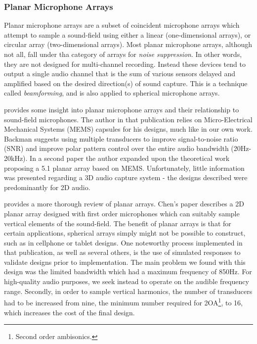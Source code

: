 \subsubsection{Planar Microphone Arrays}

Planar microphone arrays are a subset of coincident microphone arrays which attempt to sample a sound-field using either a linear (one-dimensional arrays), or circular array (two-dimensional arrays). Most planar microphone arrays, although not all, fall under tha category of arrays for \textit{noise suppression}. In other words, they are not designed for multi-channel recording. Instead these devices tend to output a single audio channel that is the sum of various sensors delayed and amplified based on the desired direction(s) of sound capture. This is a technique called \textit{beamforming}, and is also applied to spherical microphone arrays.

\cite{backman2006miniature} provides some insight into planar microphone arrays and their relationship to sound-field microphones. The author in that publication relies on Micro-Electrical Mechanical Systems (MEMS) capsules for his designs, much like in our own work. Backman suggests using multiple transducers to improve signal-to-noise ratio (SNR) and improve polar pattern control over the entire audio bandwidth (20Hz-20kHz). In a second paper \cite{backman2006gradient} the author expanded upon the theoretical work proposing a 5.1 planar array based on MEMS. Unfortunately, little information was presented regarding a 3D audio capture system - the designs described were predominantly for 2D audio. 


\cite{chen2015theory} provides a more thorough review of planar arrays. Chen's paper describes a 2D planar array designed with first order microphones which can suitably sample vertical elements of the sound-field. The benefit of planar arrays is that for certain applications, spherical arrays simply might not be possible to construct, such as in cellphone or tablet designs. One noteworthy process implemented in that publication, as well as several others, is the use of simulated responses to validate designs prior to implementation. The main problem we found with this design was the limited bandwidth which had a maximum frequency of 850Hz. For high-quality audio purposes, we seek instead to operate on the audible frequency range. Secondly, in order to sample vertical harmonics, the number of transducers had to be increased from nine, the minimum number required for 2OA\footnote{Second order ambisonics.}, to 16, which increases the cost of the final design. 


